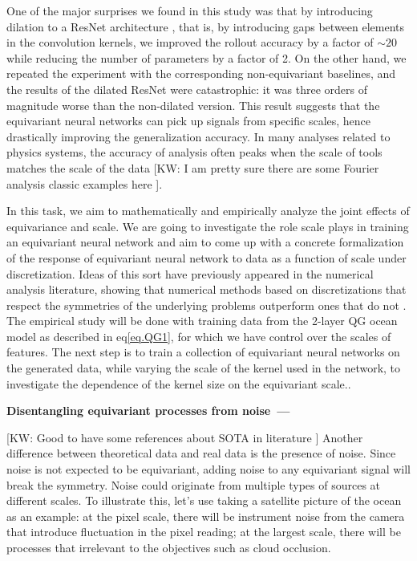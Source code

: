 \documentclass[11pt]{article}
\renewcommand{\paragraph}[1]{\medskip\par\noindent\textbf{#1~---}}
\newcommand{\kw}[1]{{\color{RoyalBlue}[KW: #1 ]}}
\begin{document}
One of the major surprises we found in this study was that by introducing dilation to a ResNet architecture \cite{yu2017dilated}, that is, by introducing gaps between elements in the convolution kernels, we improved the rollout accuracy by a factor of $\sim 20$ while reducing the number of parameters by a factor of 2. On the other hand, we repeated the experiment with the corresponding non-equivariant baselines, and the results of the dilated ResNet were catastrophic: it was three orders of magnitude worse than the non-dilated version. This result suggests that the equivariant neural networks can pick up signals from specific scales, hence drastically improving the generalization accuracy. In many analyses related to physics systems, the accuracy of analysis often peaks when the scale of tools matches the scale of the data \cite{}\kw{I am pretty sure there are some Fourier analysis classic examples here}. 

In this task, we aim to mathematically and empirically analyze the joint effects of equivariance and scale.
We are going to investigate the role scale plays in training an equivariant neural network and aim to come up with a concrete formalization of the response of equivariant neural network to data as a function of scale under discretization. Ideas of this sort have previously appeared in the numerical analysis literature, showing that numerical methods based on discretizations that respect the symmetries of the underlying problems outperform ones that do not \cite{verstappen2003symmetry}.  The empirical study will be done with training data from the 2-layer QG ocean model as described in eq\ref{eq.QG1}, for which we have control over the scales of features. The next step is to train a collection of equivariant neural networks on the generated data, while varying the scale of the kernel used in the network, to investigate the dependence of the kernel size on the equivariant scale.. 


\paragraph{Disentangling equivariant processes from noise}

\kw{Good to have some references about SOTA in literature}
\cite{Wang2022ApproximatelyEN}
Another difference between theoretical data and real data is the presence of noise. Since noise is not expected to be equivariant, adding noise to any equivariant signal will break the symmetry. Noise could originate from multiple types of sources at different scales. To illustrate this, let's use taking a satellite picture of the ocean as an example: at the pixel scale, there will be instrument noise from the camera that introduce fluctuation in the pixel reading; at the largest scale, there will be processes that irrelevant to the objectives such as cloud occlusion. 
\end{document}
